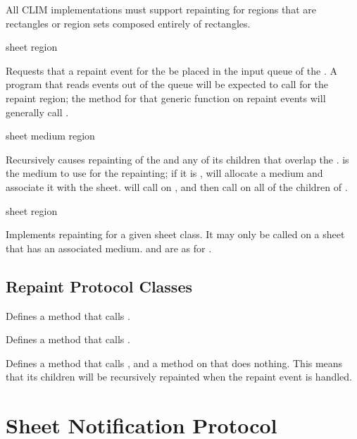 All CLIM implementations must support repainting for regions that are rectangles
or region sets composed entirely of rectangles.

 {sheet region}

Requests that a repaint event for the   be placed in
the input queue of the  .  A program that reads events
out of the queue will be expected to call  for the repaint
region; the method for that generic function on repaint events will generally
call .

 {sheet medium region}

Recursively causes repainting of the   and any of its
children that overlap the  .   is the
medium to use for the repainting; if it is ,  will
allocate a medium and associate it with the sheet.   will
call  on , and then call  on all
of the children of .

 {sheet region}

Implements repainting for a given sheet class.  It may only be called on a sheet
that has an associated medium.   and  are as for
.


\subsection {Repaint Protocol Classes}


Defines a  method that calls .


Defines a  method that calls .


Defines a  method that calls , and a
method on  that does nothing.  This means that its children
will be recursively repainted when the repaint event is handled.


\section {Sheet Notification Protocol}

